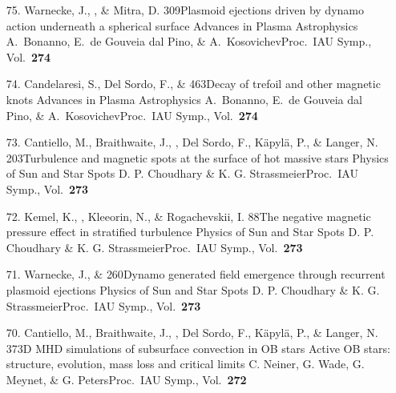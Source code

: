 \begin{itemize}
\item[75.]
Warnecke, J., \Brandenburg, \& Mitra, D.
{309}{Plasmoid ejections driven by dynamo action underneath a spherical surface}
{Advances in Plasma Astrophysics}
{A.\ Bonanno, E.\ de Gouveia dal Pino, \& A.\ Kosovichev}{Proc.\ IAU Symp., Vol.\ {\bf 274}}

\item[74.]
Candelaresi, S., Del Sordo, F., \& \Brandenburg{}
{463}{Decay of trefoil and other magnetic knots}
{Advances in Plasma Astrophysics}
{A.\ Bonanno, E.\ de Gouveia dal Pino, \& A.\ Kosovichev}{Proc.\ IAU Symp., Vol.\ {\bf 274}}

\item[73.]
Cantiello, M., Braithwaite, J., \Brandenburg, Del Sordo, F., K\"apyl\"a, P., \& Langer, N.
{203}{Turbulence and magnetic spots at the surface of hot massive stars}
{Physics of Sun and Star Spots}
{D. P. Choudhary \& K. G. Strassmeier}{Proc.\ IAU Symp., Vol.\ {\bf 273}}

\item[72.]
Kemel, K., \Brandenburg, Kleeorin, N., \& Rogachevskii, I.
{88}{The negative magnetic pressure effect in stratified turbulence}
{Physics of Sun and Star Spots}
{D. P. Choudhary \& K. G. Strassmeier}{Proc.\ IAU Symp., Vol.\ {\bf 273}}

\item[71.]
Warnecke, J., \& \Brandenburg{}
{260}{Dynamo generated field emergence through recurrent plasmoid ejections}
{Physics of Sun and Star Spots}
{D. P. Choudhary \& K. G. Strassmeier}{Proc.\ IAU Symp., Vol.\ {\bf 273}}

\item[70.]
Cantiello, M., Braithwaite, J., \Brandenburg, Del Sordo, F., K\"apyl\"a, P., \& Langer, N.
{37}{3D MHD simulations of subsurface convection in OB stars}
{Active OB stars: structure, evolution, mass loss and critical limits}
{C. Neiner, G. Wade, G. Meynet, \& G. Peters}{Proc.\ IAU Symp., Vol.\ {\bf 272}}


\end{itemize}
